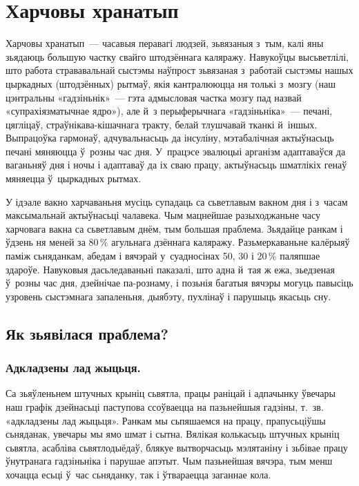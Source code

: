 \chapter{Харчовы хранатып}

Харчовы хранатып~--- часавыя перавагі людзей, зьвязаныя з~тым, калі яны зьядаюць большую частку свайго штодзённага каляражу. Навукоўцы высьветлілі, што работа стрававальнай сыстэмы наўпрост зьвязаная з~работай сыстэмы нашых цыркадных (штодзённых) рытмаў, якія кантралююцца ня толькі з~мозгу (наш цэнтральны «гадзіньнік»~--- гэта адмысловая частка мозгу пад назвай «супрахіязматычнае ядро»), але й~з перыферычнага «гадзіньніка»~--- печані, цягліцаў, страўнікава-кішачнага тракту, белай тлушчавай тканкі й~іншых. Выпрацоўка гармонаў, адчувальнасьць да інсуліну, мэтабалічная актыўнасьць печані мяняюцца ў~розны час дня. У~працэсе эвалюцыі арганізм адаптаваўся да ваганьняў дня і ночы і адаптаваў да іх сваю працу, актыўнасьць шматлікіх генаў мяняецца ў~цыркадных рытмах.

У ідэале вакно харчаваньня мусіць супадаць са сьветлавым вакном дня і з~часам максымальнай актыўнасьці чалавека. Чым мацнейшае разыходжаньне часу харчовага вакна са сьветлавым днём, тым большая праблема. Зьядайце ранкам і ўдзень ня меней за 80\,\% агульнага дзённага каляражу. Разьмеркаваньне калёрыяў паміж сьняданкам, абедам і вячэрай у~суадносінах 50, 30 і 20\,\% паляпшае здароўе. Навуковыя дасьледаваньні паказалі, што адна й~тая ж ежа, зьедзеная ў~розны час дня, дзейнічае па-рознаму, і позьнія багатыя вячэры могуць павысіць узровень сыстэмнага запаленьня, дыябэту, пухлінаў і парушыць якасьць сну.

\section{Як зьявілася праблема?}

\subsection{Адкладзены лад жыцьця.}
Са зьяўленьнем штучных крыніц сьвятла, працы раніцай і адпачынку ўвечары наш графік дзейнасьці паступова ссоўваецца на пазьнейшыя гадзіны, т.~зв. «адкладзены лад жыцьця». Ранкам мы сьпяшаемся на працу, прапусьціўшы сьняданак, увечары мы ямо шмат і сытна. Вялікая колькасьць штучных крыніц сьвятла, асабліва сьвятлодыёдаў, блякуе вытворчасьць мэлятаніну і зьбівае працу ўнутранага гадзіньніка і парушае апэтыт. Чым пазьнейшая вячэра, тым менш хочацца есьці ў~час сьняданку, так і ўтвараецца заганнае кола.

